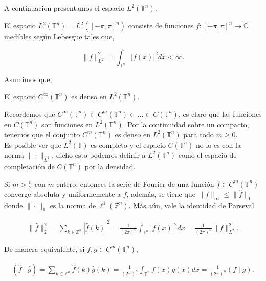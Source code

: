 \documentclass[12pt]{article}
\newcommand\T{\mathbb{T}}
\begin{document}
A continuación presentamos el espacio $L^2(\T^n)$.

\begin{definition}
El espacio $L^2\left(\mathbb{T}^n\right)=L^2\left([-\pi, \pi]^n\right)$ consiste de funciones $f:[-\pi, \pi]^n \rightarrow \mathbb{C}$ medibles según Lebesgue tales que,

$$\|f\|_{L^2}^2=\int_{\T^n}|f(x)|^2 d x<\infty.$$
\end{definition}
Asumimos que,
\begin{theorem}
El espacio $C^{\infty}\left(\mathbb{T}^n\right)$ es denso en $L^2\left(\mathbb{T}^n\right)$.    
\end{theorem}

\begin{note}
Recordemos que $C^{\infty}(\T^n)\subset C^m(\T^ n)\subset  \ldots\subset C(\T^n)$, es claro que las funciones en $C(\T^n)$ son funciones en $L^2(\T^n)$. Por la continuidad sobre un compacto, tenemos que el conjunto $C^m(\T^n)$ es denso en $L^2(\T^n)$ para todo $m\geq 0$.\\

Es posible ver que $L^2(\T)$ es completo y el espacio $C(\T^n)$ no lo es con  la norma $\|\cdot\|_{L^2}$, dicho esto podemos definir a $L^2(\T^n)$ como el espacio de completación de $C(\T^n)$ por la densidad.
\end{note}

\begin{theorem}\label{convergencia}
Si $m>\frac{n}{2}$ con $m$ entero, entonces la serie de Fourier de una función $f \in C^m\left(\mathbb{T}^n\right)$ converge absoluta y uniformemente a $f$, además, se tiene que $\|f\|_{\infty} \leq\|\widehat{f}\|_1$ donde $\|\cdot\|_1$ es la norma de $\ell^1\left(\mathbb{Z}^n\right)$. Más aún, vale la identidad de Parseval

\begin{align}
\|\widehat{f}\|_2^2=\sum_{k \in \mathbb{Z}^n}|\widehat{f}(k)|^2=\frac{1}{(2 \pi)^n} \int_{\T^n}|f(x)|^2 d x=\frac{1}{(2 \pi)^n}\|f\|_{L^2}^2.
\end{align}

De manera equivalente, si $f, g \in C^m\left(\mathbb{T}^n\right)$,

\begin{align}
(\widehat{f} \mid \widehat{g})=\sum_{k \in \mathbb{Z}^n} \widehat{f}(k) \overline{\widehat{g}(k)}=\frac{1}{(2 \pi)^n} \int_{\T^n} f(x) \overline{g(x)} d x=\frac{1}{(2 \pi)^n}(f \mid g).
\end{align}

\end{theorem}
\end{document}
